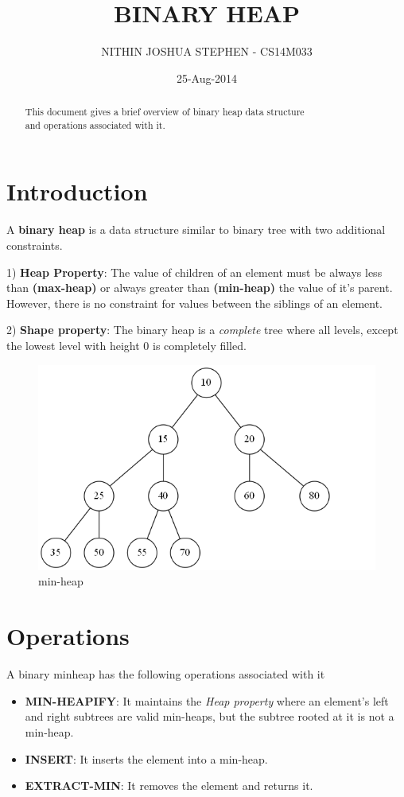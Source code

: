 \documentclass[11pt,a4paper]{amsart}
\theoremstyle{plain}
\numberwithin{equation}{section}
\begin{document}
\title{BINARY HEAP}
\author{NITHIN JOSHUA STEPHEN - CS14M033}
\date{25-Aug-2014}

\begin{abstract}
\noindent
\centering
This document gives a brief overview of binary heap data structure \\ and operations associated with it.
\end{abstract}
\maketitle

\section{\textbf{Introduction}}

A \textbf{binary heap} is a data structure similar to binary tree with two additional constraints.

	1) \textbf{Heap Property}: The value of children of an element must be always less than \textbf{(max-heap)} or always greater than \textbf{(min-heap)} the value of it's parent. However, there is no constraint for values between the siblings of an element.
	
	2) \textbf{Shape property}: The binary heap is a \emph{complete} tree where all levels, except the lowest level with height $0$ is completely filled.
	
\begin{figure}[h] \label{fig:minheap}
\centering
\includegraphics[scale=0.4]{minheap}
\caption{min-heap}
\end{figure}

\section{\textbf{Operations}}
A binary minheap has the following operations associated with it
\begin{itemize}
	\item \textbf{MIN-HEAPIFY}: It maintains the \textit{Heap property} where an element's left and right subtrees are valid min-heaps, but the subtree rooted at it is not a min-heap.
	\item \textbf{INSERT}: It inserts the element into a min-heap.
	\item \textbf{EXTRACT-MIN}: It removes the element and returns it.
\end{itemize}
\end{document}
